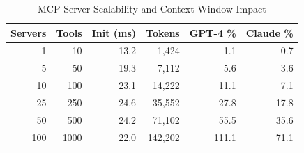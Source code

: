 
\begin{table}[h]
\centering
\caption{MCP Server Scalability and Context Window Impact}
\label{tab:scalability_benchmark}
\begin{tabular}{rrrrrr}
\toprule
\textbf{Servers} & \textbf{Tools} & \textbf{Init (ms)} & \textbf{Tokens} & \textbf{GPT-4 \%} & \textbf{Claude \%} \\
\midrule
1 & 10 & 13.2 & 1,424 & 1.1 & 0.7 \\
5 & 50 & 19.3 & 7,112 & 5.6 & 3.6 \\
10 & 100 & 23.1 & 14,222 & 11.1 & 7.1 \\
25 & 250 & 24.6 & 35,552 & 27.8 & 17.8 \\
50 & 500 & 24.2 & 71,102 & 55.5 & 35.6 \\
100 & 1000 & 22.0 & 142,202 & 111.1 & 71.1 \\
\bottomrule
\end{tabular}
\end{table}
